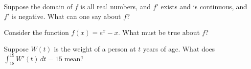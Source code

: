 \documentclass{ximera}
\begin{document}
\begin{shuffle}

\begin{problem}
  Suppose the domain of $f$ is all real numbers, and $f'$ exists and is continuous, and $f'$ is negative.  What can one say about $f$?
  \begin{multipleChoice}
  \end{multipleChoice}
\end{problem}

\begin{problem}
  Consider the function $f(x) = e^x - x$.  What must be true about $f$?
  \begin{multipleChoice}
  \end{multipleChoice}
\end{problem}

\begin{problem}
  Suppose $W(t)$ is the weight of a person at $t$ years of age.  What does $\int_{18}^{19} W'(t) \, dt = 15$ mean?
  \begin{multipleChoice}
  \end{multipleChoice}
\end{problem}




\end{shuffle} 
\end{document}
